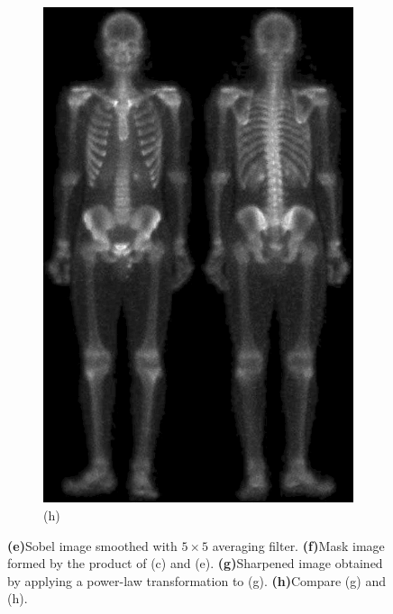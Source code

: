 \begin{figure}[h!]
\begin{subfigure}[b]{0.4\linewidth}
    	\includegraphics[width=\linewidth]{myfigure/p2/2-h.png}
		\caption*{(h)}
		\label{fig:2h}
  	\end{subfigure}
  	\caption{\textbf{(e)}Sobel image smoothed with $5\times 5$ averaging filter. \textbf{(f)}Mask image formed by the product of (c) and (e). \textbf{(g)}Sharpened image obtained by applying a power-law transformation to (g). \textbf{(h)}Compare (g) and (h).}
  	\label{fig:efgh}
\end{figure}


